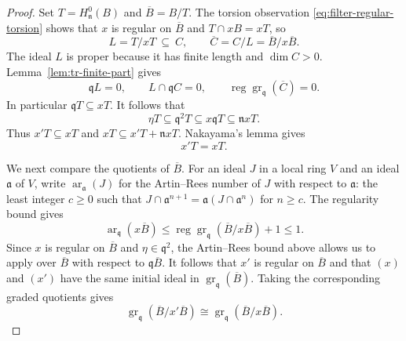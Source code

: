 \documentclass[11pt,reqno]{amsart}
\numberwithin{equation}{section}
\theoremstyle{definition}
\begin{document}
\begin{proof}
Set $T=H^0_{\mathfrak n}(B)$ and $\overline B=B/T$.
The torsion observation \eqref{eq:filter-regular-torsion} shows
that $x$ is regular on $\overline B$ and $T\cap xB=xT$, so
\[
 L=T/xT\ \subseteq\ C,
 \qquad \overline C=C/L=\overline B/x\overline B.
\]
The ideal $L$ is proper because it has finite length and $\dim C>0$.
Lemma~\ref{lem:tr-finite-part} gives
\begin{equation}\label{eq:tr-torsion-data}
 \mathfrak qL=0,\qquad L\cap\mathfrak q C=0,
 \qquad\operatorname{reg}\operatorname{gr}_{\mathfrak q}(\overline C)=0.
\end{equation}
In particular $\mathfrak qT\subseteq xT$. It follows that
\[
 \eta T\subseteq\mathfrak q^2T
 \subseteq x\mathfrak qT\subseteq\mathfrak n xT.
\]
Thus $x'T\subseteq xT$ and $xT\subseteq x'T+\mathfrak n xT$.
Nakayama's lemma gives
\begin{equation}\label{eq:tr-fixed-torsion-image}
 x'T=xT.
\end{equation}

We next compare the quotients of $\overline B$. For an ideal $J$ in a
local ring $V$ and an ideal $\mathfrak a$ of $V$, write
$\operatorname{ar}_{\mathfrak a}(J)$ for the Artin--Rees number of $J$
with respect to $\mathfrak a$: the least integer $c\geq0$ such that
$J\cap\mathfrak a^{n+1}=\mathfrak a(J\cap\mathfrak a^n)$ for $n\geq c$.
The regularity bound
\cite[Corollary 2.5]{QT} gives
\[
 \operatorname{ar}_{\mathfrak q}(x\overline B)
 \leq\operatorname{reg}\operatorname{gr}_{\mathfrak q}
            (\overline B/x\overline B)+1\leq1.
\]
Since $x$ is regular on $\overline B$ and
$\eta\in\mathfrak q^2$, the Artin--Rees bound above allows us
to apply \cite[Proposition~3.2]{QT} over $\overline B$
with respect to $\mathfrak q\overline B$.
It follows that $x'$ is regular on $\overline B$ and that
$(x)$ and $(x')$ have the same initial ideal in
$\operatorname{gr}_{\mathfrak q}(\overline B)$.
Taking the corresponding graded quotients gives
\begin{equation}\label{eq:tr-reduced-graded}
 \operatorname{gr}_{\mathfrak q}(\overline B/x'\overline B)
 \cong\operatorname{gr}_{\mathfrak q}(\overline B/x\overline B).
\end{equation}


\end{proof}
\end{document}
